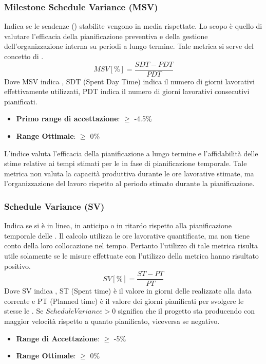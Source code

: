 \documentclass[12pt,a4paper]{article}
\begin{document}
\subsubsection{Milestone Schedule Variance (MSV)}
Indica se le scadenze () stabilite vengono in media rispettate. Lo scopo è quello di valutare l'efficacia della pianificazione preventiva e della gestione dell'organizzazione interna su periodi a lungo termine. Tale metrica si serve del concetto di .
\[MSV [\%] = \frac{SDT - PDT}{PDT}\]
Dove  MSV indica , SDT (Spent Day Time) indica il numero di giorni lavorativi effettivamente utilizzati, PDT indica il numero di giorni lavorativi consecutivi pianificati.
\begin{itemize}
	\item \textbf{Primo range di accettazione}: $\geq$ -4.5\%
	\item \textbf{Range Ottimale}: $\geq$ 0\%
\end{itemize}
L'indice  valuta l'efficacia della pianificazione a lungo termine e l'affidabilità delle stime relative ai tempi stimati per le   in fase di pianificazione temporale. Tale metrica non valuta la capacità produttiva durante le ore lavorative stimate, ma l'organizzazione del lavoro rispetto al periodo stimato durante la pianificazione.

\subsubsection{Schedule Variance (SV)} \label{schedule_variance}
Indica se si è in linea, in anticipo o in ritardo rispetto alla pianificazione temporale delle . Il calcolo utilizza le ore lavorative quantificate, ma non tiene conto della loro collocazione nel tempo. Pertanto l'utilizzo di tale metrica risulta utile solamente se le misure effettuate con l'utilizzo della metrica  hanno risultato positivo.
\[SV [\%] = \frac{ST - PT}{PT}\]
Dove SV indica  , ST (Spent time) è il valore in giorni delle   realizzate alla data corrente e PT (Planned time) è il valore dei giorni pianificati per svolgere le stesse le  .
Se $ScheduleVariance > 0$ significa che il progetto sta producendo con maggior velocità rispetto a quanto pianificato, viceversa se negativo.
\begin{itemize}
\item \textbf{Range di Accettazione}: $\geq$ -5\%
\item \textbf{Range Ottimale}: $\geq$ 0\%
\end{itemize}
\end{document}
